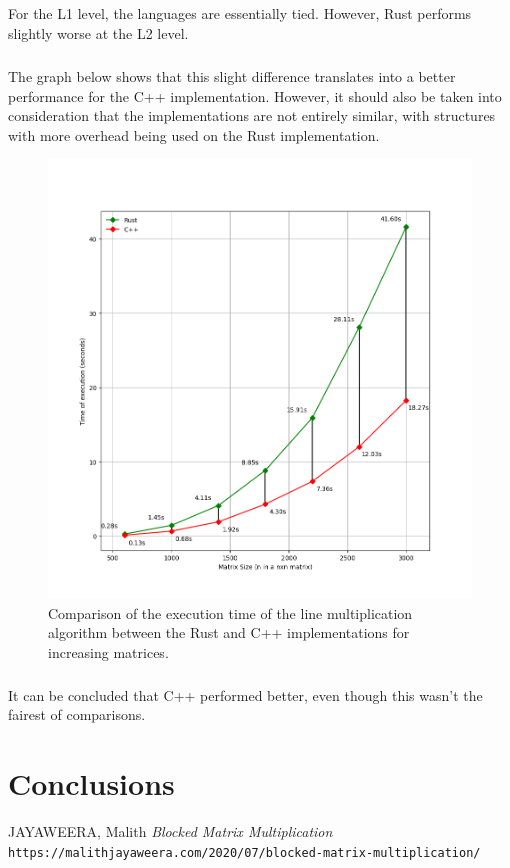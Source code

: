 \documentclass{report}
\begin{document}
			\paragraph{}For the L1 level, the languages are essentially tied. However, Rust performs slightly worse at the L2 level.
			
			\paragraph{}The graph below shows that this slight difference translates into a better performance for the C++ implementation. However, it should also be taken into consideration that the implementations are not entirely similar, with structures with more overhead being used on the Rust implementation.
			
			\begin{figure}[H]
				\begin{adjustbox}{center}
					\includegraphics[scale=0.5]{line_algorithm_comparison.png}
				\end{adjustbox}
				\caption{Comparison of the execution time of the line multiplication algorithm between the Rust and C++ implementations for increasing matrices.}
			\end{figure}
		
			\paragraph{}It can be concluded that C++ performed better, even though this wasn't the fairest of comparisons.
	
	\chapter{Conclusions}
	
	\begin{thebibliography}{1}
		JAYAWEERA, Malith \textit{Blocked Matrix Multiplication}
		\\\texttt{https://malithjayaweera.com/2020/07/blocked-matrix-multiplication/}
	\end{thebibliography}
	
\end{document}

